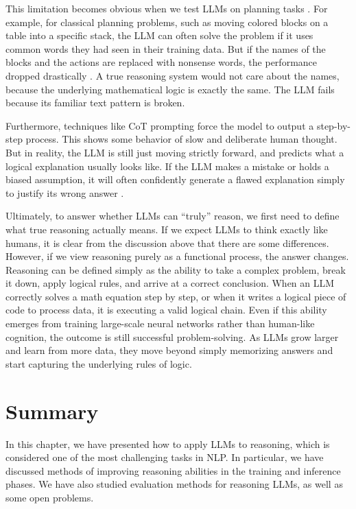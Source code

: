 This limitation becomes obvious when we test LLMs on planning tasks \cite{valmeekam-etal:2023planbench}. For example, for classical planning problems, such as moving colored blocks on a table into a specific stack, the LLM can often solve the problem if it uses common words they had seen in their training data. But if the names of the blocks and the actions are replaced with nonsense words, the performance dropped drastically \cite{kambhampati-etal:2024can}. A true reasoning system would not care about the names, because the underlying mathematical logic is exactly the same. The LLM fails because its familiar text pattern is broken.

Furthermore, techniques like CoT prompting force the model to output a step-by-step process. This shows some behavior of slow and deliberate human thought. But in reality, the LLM is still just moving strictly forward, and predicts what a logical explanation usually looks like. If the LLM makes a mistake or holds a biased assumption, it will often confidently generate a flawed explanation simply to justify its wrong answer \cite{chen-etal:2025reasoning}.

Ultimately, to answer whether LLMs can ``truly'' reason, we first need to define what true reasoning actually means. If we expect LLMs to think exactly like humans, it is clear from the discussion above that there are some differences. However, if we view reasoning purely as a functional process, the answer changes. Reasoning can be defined simply as the ability to take a complex problem, break it down, apply logical rules, and arrive at a correct conclusion. When an LLM correctly solves a math equation step by step, or when it writes a logical piece of code to process data, it is executing a valid logical chain. Even if this ability emerges from training large-scale neural networks rather than human-like cognition, the outcome is still successful problem-solving. As LLMs grow larger and learn from more data, they move beyond simply memorizing answers and start capturing the underlying rules of logic.


\section{Summary}

In this chapter, we have presented how to apply LLMs to reasoning, which is considered one of the most challenging tasks in NLP. In particular, we have discussed methods of improving reasoning abilities in the training and inference phases. We have also studied evaluation methods for reasoning LLMs, as well as some open problems.

